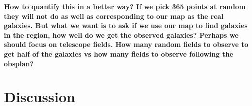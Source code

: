 \documentclass[useAMS,usenatbib]{mn2e}
\begin{document}
{\bf How to quantify this
  in a better way?  If we pick 365 points at random they will not do
  as well as corresponding to our map as the real galaxies.  But what
  we want is to ask if we use our map to find galaxies in the region,
  how well do we get the observed galaxies?  Perhaps we should focus
  on telescope fields.  How many random fields to observe to get half
  of the galaxies vs how many fields to observe following the obsplan?
}

\section{Discussion}





\label{lastpage}
\end{document}
